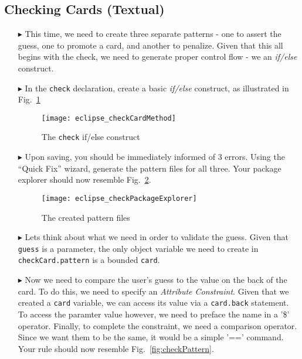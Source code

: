 \newpage
\subsection{Checking Cards (Textual)}
\texHeader
\hypertarget{checkCard tex}{}
 
\begin{itemize}
   
\item[$\blacktriangleright$] This time, we need to create three separate patterns - one to assert the guess, one to promote a card, and another to penalize.
Given that this all begins with the check, we need to generate proper control flow - we an \emph{if/else} construct.

\item[$\blacktriangleright$] In the \texttt{check} declaration, create a basic \emph{if/else} construct, as illustrated in Fig.~\ref{fig:checkDec}

\begin{figure}[htbp]
\begin{center}
  \texttt{[image: eclipse\_checkCardMethod]}
  \caption{The \texttt{check} if/else construct}
  \label{fig:checkDec}
\end{center}
\end{figure} 

\item[$\blacktriangleright$] Upon saving, you should be immediately informed of 3 errors. Using the ``Quick Fix'' wizard, generate the pattern files for all
three. Your package explorer should now resemble Fig.~\ref{fig:checkPatternsExplorer}.

\begin{figure}[htbp]
\begin{center}
  \texttt{[image: eclipse\_checkPackageExplorer]}
  \caption{The created pattern files}
  \label{fig:checkPatternsExplorer}
\end{center}
\end{figure} 

\item[$\blacktriangleright$] Lets think about what we need in order to validate the guess. Given that \texttt{guess} is a parameter, the only object variable
we need to create in \texttt{checkCard.pattern} is a bounded \texttt{card}.

\item[$\blacktriangleright$] Now we need to compare the user's guess to the value on the back of the card. To do this, we need to specify an \emph{Attribute
Constraint}. Given that we created a \texttt{card} variable, we can access its value via a \texttt{card.back} statement. To access the paramter
value however, we need to preface the name in a '\$' operator. Finally, to complete the constraint, we need a comparison operator. Since we want them
to be the same, it would be a simple '==' command. Your rule should now resemble Fig.~\ref{fig:checkPattern}.


\end{itemize}
